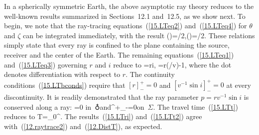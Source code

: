In a spherically symmetric Earth, the above asymptotic
ray theory reduces to the well-known results summarized
in Sections~12.1 and~12.5, as we show next.
To begin, we note that the ray-tracing equations~(\ref{15.LTeq2})
and~(\ref{15.LTeq4}) for $\theta$ and $\zeta$ can be integrated
immediately, with the result
\eq
\theta(\phi)=\pi/2,\qquad\zeta(\phi)=\pi/2.
\en
These relations simply state that every ray is confined to the plane
containing the source, receiver and the center of the Earth.  The
remaining equations~(\ref{15.LTeq1}) and~(\ref{15.LTeq3}) governing $r$
and $i$ reduce to
\eq
{}=r\cot i,\qquad
{}=r(/v)-1,
\label{15.LTri}
\en
where the dot denotes differentiation with respect to $r$.
The continuity conditions~(\ref{15.LTbconds}) require that
$[r]^+_-=0$ and $[v^{-1}\sin i]^+_-=0$ at every discontinuity.
It is readily demonstrated that the ray parameter
$p=rv^{-1}\sin i$ is conserved along a ray:
\eq
{}=0
\quad\mbox{in $\earth$}\quad\mbox{and}\quad
[p]^+_-=0\quad\mbox{on $\Sigma$}.
\en
The travel time~(\ref{15.LTt}) reduces to
\eq \label{15.LTt2}
T=\int_0^{\Theta}.
\en
The results~(\ref{15.LTri}) and~(\ref{15.LTt2})
agree with~(\ref{12.raytrace2}) and~(\ref{12.DistT}),
as expected.

